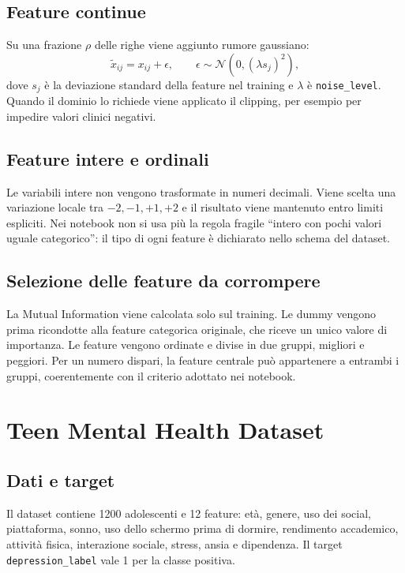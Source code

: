 \documentclass[11pt,a4paper]{article}
\begin{document}
\subsection{Feature continue}

Su una frazione $\rho$ delle righe viene aggiunto rumore gaussiano:
\[
\widetilde{x}_{ij}=x_{ij}+\epsilon, \qquad
\epsilon\sim\mathcal{N}(0,(\lambda s_j)^2),
\]
dove $s_j$ è la deviazione standard della feature nel training e $\lambda$ è \texttt{noise\_level}. Quando il dominio lo richiede viene applicato il clipping, per esempio per impedire valori clinici negativi.

\subsection{Feature intere e ordinali}

Le variabili intere non vengono trasformate in numeri decimali. Viene scelta una variazione locale tra $-2,-1,+1,+2$ e il risultato viene mantenuto entro limiti espliciti. Nei notebook non si usa più la regola fragile ``intero con pochi valori uguale categorico'': il tipo di ogni feature è dichiarato nello schema del dataset.

\subsection{Selezione delle feature da corrompere}

La Mutual Information viene calcolata solo sul training. Le dummy vengono prima ricondotte alla feature categorica originale, che riceve un unico valore di importanza. Le feature vengono ordinate e divise in due gruppi, migliori e peggiori. Per un numero dispari, la feature centrale può appartenere a entrambi i gruppi, coerentemente con il criterio adottato nei notebook.

\section{Teen Mental Health Dataset}

\subsection{Dati e target}

Il dataset contiene 1200 adolescenti e 12 feature: età, genere, uso dei social, piattaforma, sonno, uso dello schermo prima di dormire, rendimento accademico, attività fisica, interazione sociale, stress, ansia e dipendenza. Il target \texttt{depression\_label} vale 1 per la classe positiva.
\end{document}
